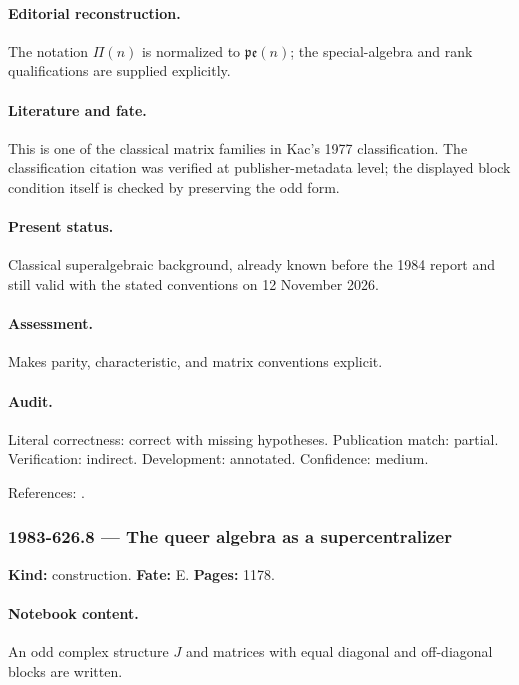 \paragraph{Editorial reconstruction.} The notation \(\Pi(n)\) is normalized to \(\mathfrak{pe}(n)\); the special-algebra and rank qualifications are supplied explicitly.

\paragraph{Literature and fate.} This is one of the classical matrix families in Kac’s 1977 classification. The classification citation was verified at publisher-metadata level; the displayed block condition itself is checked by preserving the odd form.

\paragraph{Present status.} Classical superalgebraic background, already known before the 1984 report and still valid with the stated conventions on 12 November 2026.

\paragraph{Assessment.} Makes parity, characteristic, and matrix conventions explicit.

\paragraph{Audit.} Literal correctness: correct with missing hypotheses. Publication match: partial. Verification: indirect. Development: annotated. Confidence: medium.

\noindent References: \citep{kac1977sketch,leites1980introduction}.\par

\subsubsection{1983-626.8 --- The queer algebra as a supercentralizer}

\label{item:1983-626.8}

\noindent\textbf{Kind:} construction. \textbf{Fate:} E. \textbf{Pages:} 1178.\par

\paragraph{Notebook content.} An odd complex structure \(J\) and matrices with equal diagonal and off-diagonal blocks are written.

